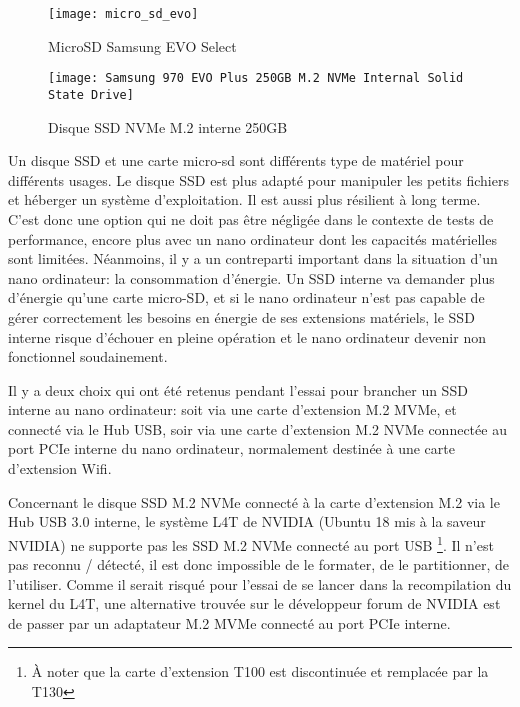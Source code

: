 \begin{figure}[H]
    \centering
    \texttt{[image: micro\_sd\_evo]}
    \caption{MicroSD Samsung EVO Select}
    \label{fig:microsd_evo_select_verte}
\end{figure}
{\color{red}}
\begin{figure}[H]
    \centering
    \texttt{[image: Samsung 970 EVO Plus 250GB M.2 NVMe Internal Solid State Drive]}
    \caption{Disque SSD NVMe M.2 interne 250GB}
    \label{fig:disquessd}
\end{figure}
\par Un disque SSD et une carte micro-sd sont différents type de matériel pour différents usages. Le disque SSD est plus adapté pour manipuler les petits fichiers et héberger un système d'exploitation. Il est aussi plus résilient à long terme. C'est donc une option qui ne doit pas être négligée dans le contexte de tests de performance, encore plus avec un nano ordinateur dont les capacités matérielles sont limitées. Néanmoins, il y a un contreparti important dans la situation d'un nano ordinateur: la consommation d'énergie. Un SSD interne va demander plus d'énergie qu'une carte micro-SD, et si le nano ordinateur n'est pas capable de gérer correctement les besoins en énergie de ses extensions matériels, le SSD interne risque d'échouer en pleine opération et le nano ordinateur devenir non fonctionnel soudainement.
\par Il y a deux choix qui ont été retenus pendant l'essai pour brancher un SSD interne au nano ordinateur: soit via une carte d'extension M.2 MVMe, et connecté via le Hub USB, soir via une carte d'extension M.2 NVMe connectée au port PCIe interne du nano ordinateur, normalement destinée à une carte d'extension Wifi.
\par Concernant le disque SSD M.2 NVMe connecté à la carte d'extension M.2 via le Hub USB 3.0 interne, le système L4T de NVIDIA (Ubuntu 18 mis à la saveur NVIDIA) ne supporte pas les SSD M.2 NVMe connecté au port USB \footnote{À noter que la carte d'extension T100 est discontinuée et remplacée par la T130}. Il n'est pas reconnu / détecté, il est donc impossible de le formater, de le partitionner, de l'utiliser. Comme il serait risqué pour l'essai de se lancer dans la recompilation du kernel du L4T, une alternative trouvée sur le développeur forum de NVIDIA est de passer par un adaptateur M.2 MVMe connecté au port PCIe interne.
